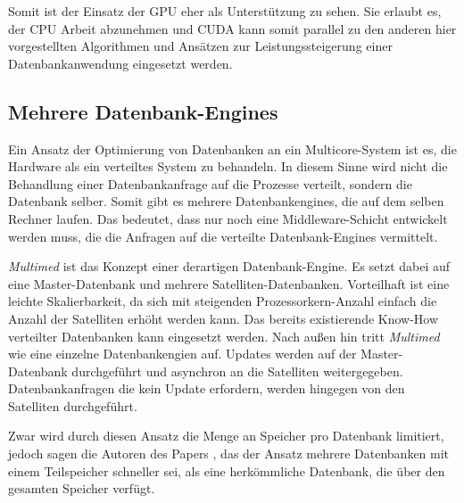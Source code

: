 Somit ist der Einsatz der GPU eher als Unterstützung zu sehen. Sie erlaubt es, der CPU Arbeit abzunehmen und CUDA kann somit parallel zu den anderen hier vorgestellten Algorithmen und Ansätzen zur Leistungssteigerung einer Datenbankanwendung eingesetzt werden.


\subsection{Mehrere Datenbank-Engines}
\label{sec:DBEngines}

Ein Ansatz der Optimierung von Datenbanken an ein Multicore-System ist es, die Hardware als ein verteiltes System zu behandeln. In diesem Sinne wird nicht die Behandlung einer Datenbankanfrage auf die Prozesse verteilt, sondern die Datenbank selber. Somit gibt es mehrere Datenbankengines, die auf dem selben Rechner laufen. Das bedeutet, dass nur noch eine Middleware-Schicht entwickelt werden muss, die die Anfragen auf die verteilte Datenbank-Engines vermittelt.

\textit{Multimed} \cite{SALOMIE} ist das Konzept einer derartigen Datenbank-Engine. Es setzt dabei auf eine Master-Datenbank und mehrere Satelliten-Datenbanken. Vorteilhaft ist eine leichte Skalierbarkeit, da sich mit steigenden Prozessorkern-Anzahl einfach die Anzahl der Satelliten erhöht werden kann. Das bereits existierende Know-How verteilter Datenbanken kann eingesetzt werden. Nach außen hin tritt \textit{Multimed} wie eine einzelne Datenbankengien auf. Updates werden auf der Master-Datenbank durchgeführt und asynchron an die Satelliten weitergegeben. Datenbankanfragen die kein Update erfordern, werden hingegen von den Satelliten durchgeführt. 

Zwar wird durch diesen Ansatz die Menge an Speicher pro Datenbank limitiert, jedoch sagen die Autoren des Papers \cite{SALOMIE}, das der Ansatz mehrere Datenbanken mit einem Teilspeicher schneller sei, als eine herkömmliche Datenbank, die über den gesamten Speicher verfügt.